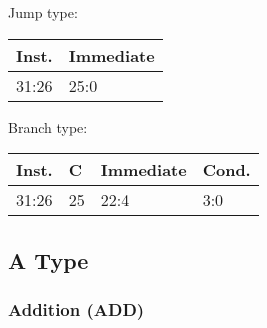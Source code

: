 \documentclass[12pt]{article}
\begin{document}
    \begin{center}
        Jump type:\\
        \vspace{1em}
        \begin{tabular}{ |p{1.8cm}|p{10.7cm}| }
            \hline
            \textbf{Inst.} & \textbf{Immediate}\\
            \hline
            31:26& 25:0\\
            \hline
        \end{tabular}
    \end{center}
    
    \begin{center}
        Branch type:\\
        \vspace{1em}
        \begin{tabular}{|p{1.8cm}|p{.3cm}|p{8.1cm}|p{1.5cm}| }
            \hline
            \textbf{Inst.} & \textbf{C} &\textbf{Immediate}&\textbf{Cond.}\\
            \hline
            31:26& 25  & 22:4 &3:0\\
            \hline
        \end{tabular}
    \end{center}
    
\newpage
\subsection{A Type}



    
    \subsubsection{Addition (ADD)}
    
\end{document}
